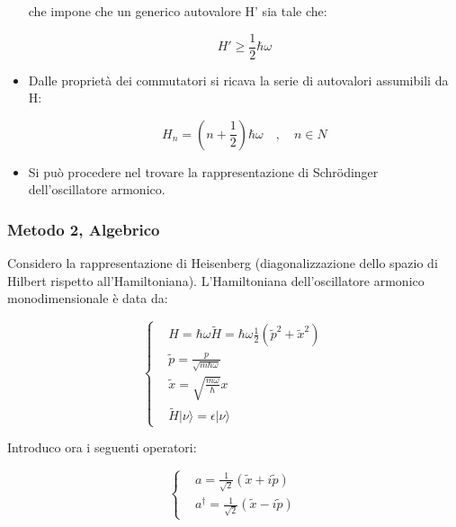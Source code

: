 \documentclass{article}
\begin{document}
\begin{itemize}
        che impone che un generico autovalore H' sia tale che:

        \begin{equation}
          H'\geq \frac{1}{2}\hbar \omega
        \end{equation}

  \item Dalle proprietà dei commutatori si ricava la serie di autovalori assumibili da H:

        \begin{equation}
          H_n=(n+\frac{1}{2})\hbar \omega \quad , \quad n \in N
        \end{equation}

  \item Si può procedere nel trovare la rappresentazione di Schrödinger dell'oscillatore armonico.
\end{itemize}

\subsubsection{Metodo 2, Algebrico}

Considero la rappresentazione di Heisenberg (diagonalizzazione dello spazio di Hilbert rispetto all'Hamiltoniana).
L'Hamiltoniana dell'oscillatore armonico monodimensionale è data da:

\begin{equation}
  \left\{
  \begin{aligned}
     & H=\hbar\omega\tilde{H}=\hbar\omega\frac{1}{2}(\tilde{p}^2+\tilde{x}^2) \\
     & \tilde{p}=\frac{p}{\sqrt{m\hbar \omega}}                               \\
     & \tilde{x}= \sqrt{\frac{m\omega}{\hbar}}x                               \\
     & \tilde{H}|\nu\rangle =\epsilon|\nu\rangle
  \end{aligned}
  \right.
\end{equation}

Introduco ora i seguenti operatori:

\begin{equation}
  \left\{
  \begin{aligned}
     & a= \frac{1}{\sqrt{2}}(\tilde{x}+i\tilde{p})           \\
     & a^{\dagger}= \frac{1}{\sqrt{2}}(\tilde{x}-i\tilde{p})
  \end{aligned}
  \right.
\end{equation}
\end{document}
